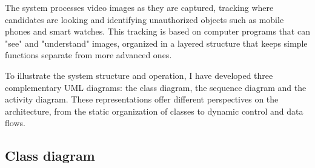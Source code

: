 \documentclass[12pt,a4paper]{article}
\begin{document}
The system processes video images as they are captured, tracking where candidates are looking and identifying unauthorized objects such as mobile phones and smart watches. This tracking is based on computer programs that can "see" and "understand" images, organized in a layered structure that keeps simple functions separate from more advanced ones.

To illustrate the system structure and operation, I have developed three complementary UML diagrams: the class diagram, the sequence diagram and the activity diagram. These representations offer different perspectives on the architecture, from the static organization of classes to dynamic control and data flows.

\subsection{Class diagram}
\end{document}
